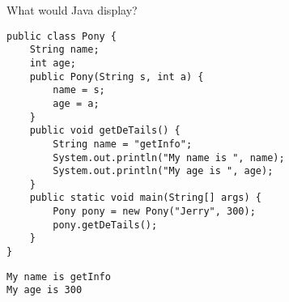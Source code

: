 \begin{blocksection}
\question What would Java display?

\begin{lstlisting}
public class Pony {
    String name;
    int age;
    public Pony(String s, int a) {
        name = s;
        age = a;
    }
    public void getDeTails() {
        String name = "getInfo";
        System.out.println("My name is ", name);
        System.out.println("My age is ", age);
    }
    public static void main(String[] args) {
        Pony pony = new Pony("Jerry", 300);
        pony.getDeTails();
    }
}
\end{lstlisting}

\begin{solution}[1.5in]
\begin{verbatim}
My name is getInfo
My age is 300
\end{verbatim}
\end{solution}
\end{blocksection}
